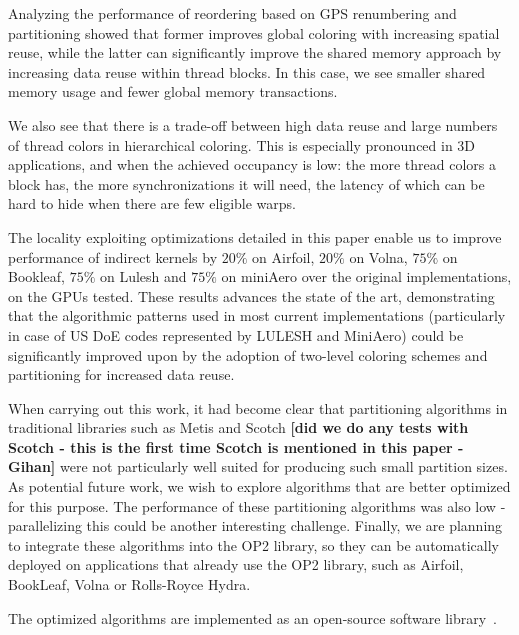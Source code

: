 \documentclass[number]{elsarticle}
\begin{document}
Analyzing the performance of reordering based on GPS renumbering and 
partitioning showed that former improves global coloring with increasing 
spatial reuse, while the latter can significantly improve the shared memory 
approach by increasing data reuse within thread blocks. In this case, we 
see smaller shared memory usage and fewer global memory transactions.

We also see that there is a trade-off between high data reuse and large numbers 
of thread colors in hierarchical coloring. This is especially pronounced in 3D 
applications, and when the achieved occupancy is low: the more thread colors a 
block has, the more synchronizations it will need, the latency of which can be 
hard to hide when there are few eligible warps.

The locality exploiting optimizations detailed in this paper enable us to 
improve performance of indirect kernels by $20\%$ on Airfoil, $20\%$ on 
Volna, $75\%$ on Bookleaf, $75\%$ on Lulesh and $75\%$ on miniAero over the 
original implementations, on the GPUs tested. These results advances the state 
of the art, demonstrating that the algorithmic patterns used in most current 
implementations (particularly in case of US DoE codes represented by 
LULESH and MiniAero) could be significantly improved upon by the adoption of 
two-level coloring schemes and partitioning for increased data reuse.

When carrying out this work, it had become clear that partitioning algorithms in
traditional libraries such as Metis and Scotch \textbf{[did we do any tests 
with Scotch - this is the first time Scotch is mentioned in this paper - 
Gihan]} were not particularly well suited for producing such small partition 
sizes. As potential future work, we wish to explore algorithms that are better 
optimized for this purpose. The performance of these partitioning algorithms 
was also low - parallelizing this could be another interesting challenge. 
Finally, we are planning to integrate these algorithms into the OP2 library, so 
they can be automatically deployed on applications that already use the OP2 
library, such as Airfoil, BookLeaf, Volna or Rolls-Royce Hydra.

The optimized algorithms are implemented as an open-source software 
library~\cite{opt-library}. 
\end{document}
